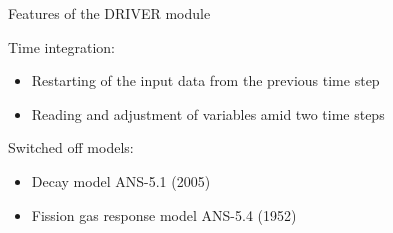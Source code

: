 \documentclass[11pt]{beamer}
\begin{document}
\begin{frame}{Features of the DRIVER module}
  \footnotesize

  \begin{block}{Time integration:}
  \begin{itemize}
    \item Restarting of the input data from the previous time step
    \item Reading and adjustment of variables amid two time steps
  \end{itemize}
  \end{block}

  \begin{block}{Switched off models:}
  \begin{itemize}
    \item Decay model ANS-5.1 (2005)
    \item Fission gas response model ANS-5.4 (1952)
  \end{itemize}
  \end{block}

\end{frame}
\end{document}
